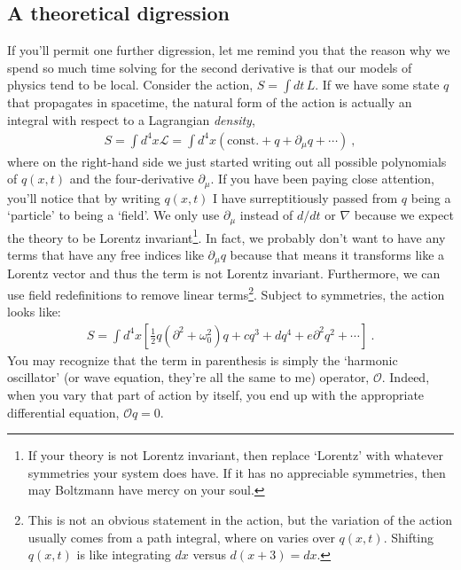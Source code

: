 \subsection{A theoretical digression}

If you'll permit one further digression, let me remind you that the reason why we spend so much time solving for the second derivative is that our models of physics tend to be local. Consider the action, $S = \int dt \, L$. If we have some state $q$ that propagates in spacetime, the natural form of the action is actually an integral with respect to a Lagrangian \emph{density},
\begin{align}
	S = \int d^4x \mathcal L = \int d^4x \left(\text{const.} + q + \partial_\mu q + \cdots\right) \ ,
\end{align}
where on the right-hand side we just started writing out all possible polynomials of $q(x,t)$ and the four-derivative $\partial_\mu$. If you have been paying close attention, you'll notice that by writing $q(x,t)$ I have surreptitiously passed from $q$ being a `particle' to being a `field'. We only use $\partial_\mu$ instead of $d/dt$ or $\nabla$ because we expect the theory to be Lorentz invariant\footnote{If your theory is not Lorentz invariant, then replace `Lorentz' with whatever symmetries your system does have. If it has no appreciable symmetries, then may Boltzmann have mercy on your soul.}. In fact, we probably don't want to have any terms that have any free indices like $\partial_\mu q$ because that means it transforms like a Lorentz vector and thus the term is not Lorentz invariant. Furthermore, we can use field redefinitions to remove linear terms\footnote{This is not an obvious statement in the action, but the variation of the action usually comes from a path integral, where on varies over $q(x,t)$. Shifting $q(x,t)$ is like integrating $dx$ versus $d(x+3) = dx$.}. Subject to symmetries, the action looks like:
\begin{align}
S = \int d^4x \left[\frac{1}{2}q\left(\partial^2 + \omega_0^2\right)q + cq^3 + dq^4 + e\partial^2 q^2 + \cdots \right]	 \ .
\end{align}
You may recognize that the term in parenthesis is simply the `harmonic oscillator' (or wave equation, they're all the same to me) operator, $\mathcal O$. Indeed, when you vary that part of action by itself, you end up with the appropriate differential equation, $\mathcal O q = 0$. 

